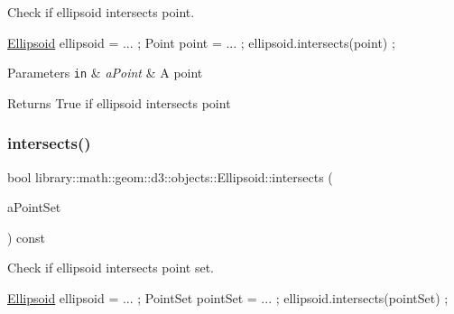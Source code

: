 Check if ellipsoid intersects point. 


\begin{DoxyCode}
\hyperlink{classlibrary_1_1math_1_1geom_1_1d3_1_1objects_1_1_ellipsoid_aae81fe0edc7f0e8d4590ea89ae73cb14}{Ellipsoid} ellipsoid = ... ;
Point point = ... ;
ellipsoid.intersects(point) ;
\end{DoxyCode}



\begin{DoxyParams}[1]{Parameters}
\mbox{\tt in}  & {\em a\+Point} & A point \\
\hline
\end{DoxyParams}
\begin{DoxyReturn}{Returns}
True if ellipsoid intersects point 
\end{DoxyReturn}
\mbox{\label{classlibrary_1_1math_1_1geom_1_1d3_1_1objects_1_1_ellipsoid_a2058e665b70c0e883a6ca195fa97120e}} 
\subsubsection{\texorpdfstring{intersects()}{intersects()}\hspace{0.1cm}{\footnotesize\ttfamily [2/10]}}
{\footnotesize\ttfamily bool library\+::math\+::geom\+::d3\+::objects\+::\+Ellipsoid\+::intersects (\begin{DoxyParamCaption}\item[{const \hyperlink{classlibrary_1_1math_1_1geom_1_1d3_1_1objects_1_1_point_set}{Point\+Set} \&}]{a\+Point\+Set }\end{DoxyParamCaption}) const}



Check if ellipsoid intersects point set. 


\begin{DoxyCode}
\hyperlink{classlibrary_1_1math_1_1geom_1_1d3_1_1objects_1_1_ellipsoid_aae81fe0edc7f0e8d4590ea89ae73cb14}{Ellipsoid} ellipsoid = ... ;
PointSet pointSet = ... ;
ellipsoid.intersects(pointSet) ;
\end{DoxyCode}



